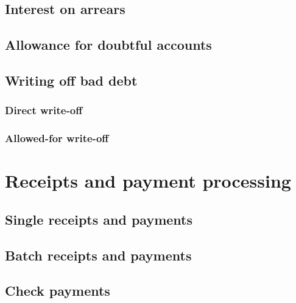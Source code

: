 \section{Interest on arrears}

\section{Allowance for doubtful accounts}



\section{Writing off bad debt}

\subsection{Direct write-off}

\subsection{Allowed-for write-off}


\chapter{Receipts and payment processing}


\section{Single receipts and payments}
\label{sec:SinglePayments}



\section{Batch receipts and payments}


\section{Check payments}

